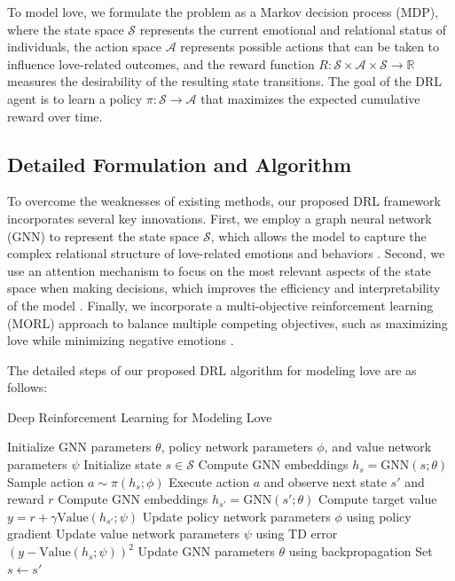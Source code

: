 To model love, we formulate the problem as a Markov decision process (MDP), where the state space $\mathcal{S}$ represents the current emotional and relational status of individuals, the action space $\mathcal{A}$ represents possible actions that can be taken to influence love-related outcomes, and the reward function $R: \mathcal{S} \times \mathcal{A} \times \mathcal{S} \rightarrow \mathbb{R}$ measures the desirability of the resulting state transitions. The goal of the DRL agent is to learn a policy $\pi: \mathcal{S} \rightarrow \mathcal{A}$ that maximizes the expected cumulative reward over time.

\subsection{Detailed Formulation and Algorithm}

To overcome the weaknesses of existing methods, our proposed DRL framework incorporates several key innovations. First, we employ a graph neural network (GNN) to represent the state space $\mathcal{S}$, which allows the model to capture the complex relational structure of love-related emotions and behaviors \citep{battaglia2018relational}. Second, we use an attention mechanism to focus on the most relevant aspects of the state space when making decisions, which improves the efficiency and interpretability of the model \citep{vaswani2017attention}. Finally, we incorporate a multi-objective reinforcement learning (MORL) approach to balance multiple competing objectives, such as maximizing love while minimizing negative emotions \citep{roijers2013survey}.

The detailed steps of our proposed DRL algorithm for modeling love are as follows:

\begin{algorithm}
    \caption{Deep Reinforcement Learning for Modeling Love}
    \begin{algorithmic}[1]
        \State Initialize GNN parameters $\theta$, policy network parameters $\phi$, and value network parameters $\psi$
            \State Initialize state $s \in \mathcal{S}$
                \State Compute GNN embeddings $h_s = \text{GNN}(s; \theta)$
                \State Sample action $a \sim \pi(h_s; \phi)$
                \State Execute action $a$ and observe next state $s'$ and reward $r$
                \State Compute GNN embeddings $h_{s'} = \text{GNN}(s'; \theta)$
                \State Compute target value $y = r + \gamma \text{Value}(h_{s'}; \psi)$
                \State Update policy network parameters $\phi$ using policy gradient
                \State Update value network parameters $\psi$ using TD error $(y - \text{Value}(h_s; \psi))^2$
                \State Update GNN parameters $\theta$ using backpropagation
                \State Set $s \leftarrow s'$
            \EndWhile
        \EndFor
    \end{algorithmic}
\end{algorithm}

